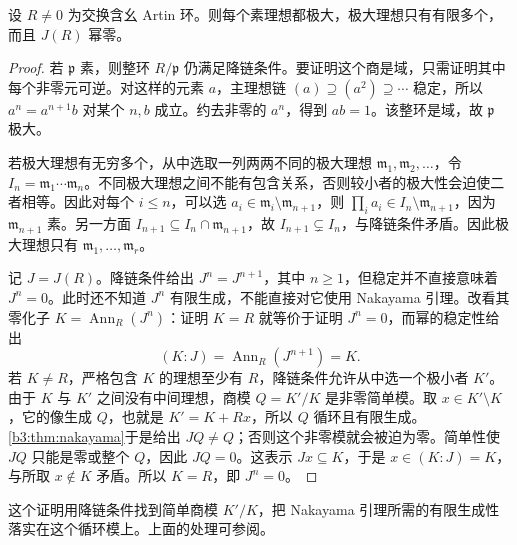 \begin{lemma}\label{b3:lem:artin-primes-radical}
	设 \(R\ne0\) 为交换含幺 Artin 环。则每个素理想都极大，极大理想只有有限多个，而且 \(J(R)\) 幂零。
\end{lemma}
\begin{proof}
	若 \(\mathfrak p\) 素，则整环 \(R/\mathfrak p\) 仍满足降链条件。要证明这个商是域，只需证明其中每个非零元可逆。对这样的元素 \(a\)，主理想链 \((a)\supseteq(a^2)\supseteq\cdots\) 稳定，所以 \(a^n=a^{n+1}b\) 对某个 \(n,b\) 成立。约去非零的 \(a^n\)，得到 \(ab=1\)。该整环是域，故 \(\mathfrak p\) 极大。

	若极大理想有无穷多个，从中选取一列两两不同的极大理想 \(\mathfrak m_1,\mathfrak m_2,\ldots\)，令 \(I_n=\mathfrak m_1\cdots\mathfrak m_n\)。不同极大理想之间不能有包含关系，否则较小者的极大性会迫使二者相等。因此对每个 \(i\le n\)，可以选 \(a_i\in\mathfrak m_i\setminus\mathfrak m_{n+1}\)，则 \(\prod_i a_i\in I_n\setminus\mathfrak m_{n+1}\)，因为 \(\mathfrak m_{n+1}\) 素。另一方面 \(I_{n+1}\subseteq I_n\cap\mathfrak m_{n+1}\)，故 \(I_{n+1}\subsetneq I_n\)，与降链条件矛盾。因此极大理想只有 \(\mathfrak m_1,\ldots,\mathfrak m_r\)。

	记 \(J=J(R)\)。降链条件给出 \(J^n=J^{n+1}\)，其中 \(n\ge1\)，但稳定并不直接意味着 \(J^n=0\)。此时还不知道 \(J^n\) 有限生成，不能直接对它使用 Nakayama 引理。改看其零化子 \(K=\operatorname{Ann}_R(J^n)\)：证明 \(K=R\) 就等价于证明 \(J^n=0\)，而幂的稳定性给出
	\[
		(K:J)=\operatorname{Ann}_R(J^{n+1})=K.
	\]
	若 \(K\ne R\)，严格包含 \(K\) 的理想至少有 \(R\)，降链条件允许从中选一个极小者 \(K'\)。由于 \(K\) 与 \(K'\) 之间没有中间理想，商模 \(Q=K'/K\) 是非零简单模。取 \(x\in K'\setminus K\)，它的像生成 \(Q\)，也就是 \(K'=K+Rx\)，所以 \(Q\) 循环且有限生成。\cref{b3:thm:nakayama}于是给出 \(JQ\ne Q\)；否则这个非零模就会被迫为零。简单性使 \(JQ\) 只能是零或整个 \(Q\)，因此 \(JQ=0\)。这表示 \(Jx\subseteq K\)，于是 \(x\in(K:J)=K\)，与所取 \(x\notin K\) 矛盾。所以 \(K=R\)，即 \(J^n=0\)。
\end{proof}

这个证明用降链条件找到简单商模 \(K'/K\)，把 Nakayama 引理所需的有限生成性落实在这个循环模上。上面的处理可参阅\cite[Theorem 3.2, p. 16]{Matsumura1989CommutativeRingTheory}。

